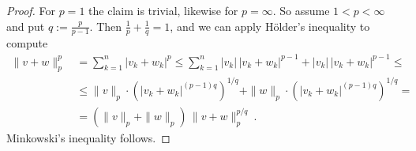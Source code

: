 \begin{proof}
For $p=1$ the claim is trivial, likewise for $p=\infty$. So assume $1  < p <  \infty$
and put $q := \frac{p}{p-1}$. Then $\frac 1p + \frac 1q =1$, and we can apply   
H\"older's inequality to compute
\begin{equation*}
  \begin{split}
   \| v + w \|_p^p\, &  =  \sum_{k=1}^n | v_k + w_k|^p \leq  
   \sum_{k=1}^n |v_k| \, | v_k + w_k|^{p-1} +  |v_k| \, | v_k + w_k|^{p-1} 
   \leq \\
   &\leq  \| v \|_p \cdot \left(  | v_k + w_k|^{(p-1)q} \right)^{1/q} +
   \| w \|_p \cdot \left(  | v_k + w_k|^{(p-1)q} \right)^{1/q}  = \\
   & = \left( \| v \|_p +  \| w \|_p \right) \,  \| v + w \|_p^{p/q} \ . 
\end{split}
\end{equation*}
Minkowski's inequality follows. 
\end{proof}

